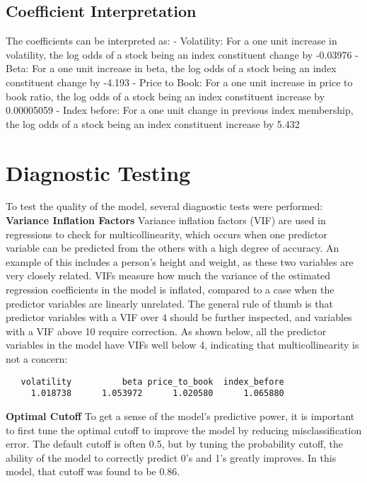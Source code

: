\documentclass[12pt,twoside]{reedthesis}
\theoremstyle{definition}
\theoremstyle{definition}
\theoremstyle{definition}
\theoremstyle{remark}
\begin{document}
\subsection{Coefficient
Interpretation}\label{coefficient-interpretation}

The coefficients can be interpreted as: \hfill\break
- Volatility: For a one unit increase in volatility, the log odds of a
stock being an index constituent change by -0.03976 \hfill\break
- Beta: For a one unit increase in beta, the log odds of a stock being
an index constituent change by -4.193 \hfill\break
- Price to Book: For a one unit increase in price to book ratio, the log
odds of a stock being an index constituent increase by 0.00005059
\hfill\break
- Index before: For a one unit change in previous index membership, the
log odds of a stock being an index constituent increase by 5.432
\hfill\break

\section{Diagnostic Testing}\label{diagnostic-testing}

To test the quality of the model, several diagnostic tests were
performed: \hfill\break
\textbf{Variance Inflation Factors} \hfill\break
Variance inflation factors (VIF) are used in regressions to check for
multicollinearity, which occurs when one predictor variable can be
predicted from the others with a high degree of accuracy. An example of
this includes a person's height and weight, as these two variables are
very closely related. VIFs measure how much the variance of the
estimated regression coefficients in the model is inflated, compared to
a case when the predictor variables are linearly unrelated. The general
rule of thumb is that predictor variables with a VIF over 4 should be
further inspected, and variables with a VIF above 10 require correction.
As shown below, all the predictor variables in the model have VIFs well
below 4, indicating that multicollinearity is not a concern:
\begin{verbatim}
   volatility          beta price_to_book  index_before 
     1.018738      1.053972      1.020580      1.065880 
\end{verbatim}
\hfill\break
\textbf{Optimal Cutoff} \hfill\break
To get a sense of the model's predictive power, it is important to first
tune the optimal cutoff to improve the model by reducing
misclassification error. The default cutoff is often 0.5, but by tuning
the probability cutoff, the ability of the model to correctly predict
0's and 1's greatly improves. In this model, that cutoff was found to be
0.86.
\end{document}
